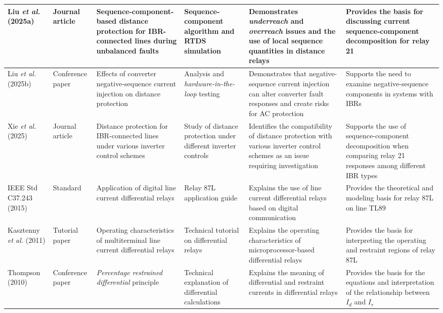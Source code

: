 \begin{longtable}{|p{}|p{}|p{}|p{}|p{}|p{}|}
    Liu \textit{et al.} (2025a) \cite{liu2025sequence} & Journal article & Sequence-component-based distance protection for IBR-connected lines during unbalanced faults & Sequence-component algorithm and RTDS simulation & Demonstrates \textit{underreach} and \textit{overreach} issues and the use of local sequence quantities in distance relays & Provides the basis for discussing current sequence-component decomposition for relay 21 \\ \hline

    Liu \textit{et al.} (2025b) \cite{liu2025impact} & Conference paper & Effects of converter negative-sequence current injection on distance protection & Analysis and \textit{hardware-in-the-loop} testing & Demonstrates that negative-sequence current injection can alter converter fault responses and create risks for AC protection & Supports the need to examine negative-sequence components in systems with IBRs \\ \hline

    Xie \textit{et al.} (2025) \cite{xie2025distance} & Journal article & Distance protection for IBR-connected lines under various inverter control schemes & Study of distance protection under different inverter controls & Identifies the compatibility of distance protection with various inverter control schemes as an issue requiring investigation & Supports the use of sequence-component decomposition when comparing relay 21 responses among different IBR types \\ \hline

    IEEE Std C37.243 (2015) \cite{ieee2015c37243} & Standard & Application of digital line current differential relays & Relay 87L application guide & Explains the use of line current differential relays based on digital communication & Provides the theoretical and modeling basis for relay 87L on line TL89 \\ \hline

    Kasztenny \textit{et al.} (2011) \cite{kasztenny2011tutorial_multiterminal} & Tutorial paper & Operating characteristics of multiterminal line current differential relays & Technical tutorial on differential relays & Explains the operating characteristics of microprocessor-based differential relays & Provides the basis for interpreting the operating and restraint regions of relay 87L \\ \hline

    Thompson (2010) \cite{thompson2010percentage} & Conference paper & \textit{Percentage restrained differential} principle & Technical explanation of differential calculations & Explains the meaning of differential and restraint currents in differential relays & Provides the basis for the equations and interpretation of the relationship between \(I_d\) and \(I_r\) \\ \hline


\end{longtable}
